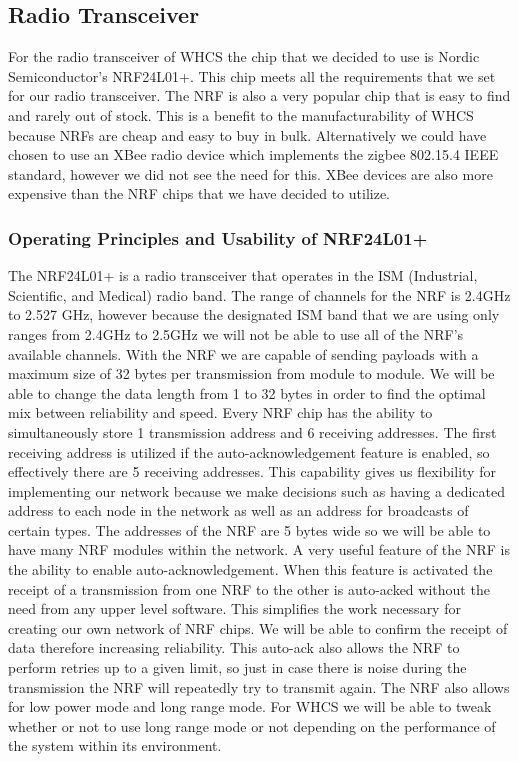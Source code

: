 
\subsection{Radio Transceiver}
For the radio transceiver of WHCS the chip that we decided to use is Nordic
Semiconductor{}'s NRF24L01+. This chip meets all the requirements that we set
for our radio transceiver. The NRF is also a very popular chip that is easy to
find and rarely out of stock. This is a benefit to the manufacturability of
WHCS because NRFs are cheap and easy to buy in bulk. Alternatively we could
have chosen to use an XBee radio device which implements the zigbee 802.15.4
IEEE standard, however we did not see the need for this. XBee devices are also
more expensive than the NRF chips that we have decided to utilize.

\subsubsection{Operating Principles and Usability of NRF24L01+}
The NRF24L01+ is a radio transceiver that operates in the ISM (Industrial,
Scientific, and Medical) radio band. The range of channels for the NRF is
2.4GHz to 2.527 GHz, however because the designated ISM band that we are using
only ranges from 2.4GHz to 2.5GHz we will not be able to use all of the NRF{}'s
available channels. With the NRF we are capable of sending payloads with a
maximum size of 32 bytes per transmission from module to module. We will be
able to change the data length from 1 to 32 bytes in order to find the optimal
mix between reliability and speed. Every NRF chip has the ability to
simultaneously store 1 transmission address and 6 receiving addresses. The
first receiving address is utilized if the auto{}-acknowledgement feature is
enabled, so effectively there are 5 receiving addresses.  This capability gives
us flexibility for implementing our network because we make decisions such as
having a dedicated address to each node in the network as well as an address
for broadcasts of certain types. The addresses of the NRF are 5 bytes wide so
we will be able to have many NRF modules within the network. A very useful
feature of the NRF is the ability to enable auto{}-acknowledgement. When this
feature is activated the receipt of a transmission from one NRF to the other is
auto{}-acked without the need from any upper level software. This simplifies
the work necessary for creating our own network of NRF chips. We will be able
to confirm the receipt of data therefore increasing reliability.  This
auto{}-ack also allows the NRF to perform retries up to a given limit, so just
in case there is noise during the transmission the NRF will repeatedly try to
transmit again. The NRF also allows for low power mode and long range mode.
For WHCS we will be able to tweak whether or not to use long range mode or not
depending on the performance of the system within its environment.

